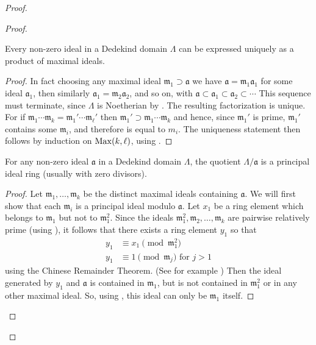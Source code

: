 \begin{proof}
\begin{proof}
\begin{lem}\label{lem:1.9}
	Every non-zero ideal in a Dedekind domain $\Lambda$ can be expressed uniquely as a product of maximal ideals.
\end{lem}

\begin{proof}
	In fact choosing any maximal ideal $\mathfrak{m}_{1} \supset \mathfrak{a}$ we have $\mathfrak{a}=\mathfrak{m}_{1} \mathfrak{a}_{1}$ for some ideal $\mathfrak{a}_{1}$, then similarly $\mathfrak{a}_{1}=\mathfrak{m}_{2} \mathfrak{a}_{2}$, and so on, with $\mathfrak{a} \subset \mathfrak{a}_{1} \subset \mathfrak{a}_{2} \subset \cdots$ This sequence must terminate, since $\Lambda$ is Noetherian by . The resulting factorization is unique. For if $\mathfrak{m}_{1} \cdots \mathfrak{m}_{k}=\mathfrak{m}_{1}' \cdots \mathfrak{m}_{\ell}'$ then $\mathfrak{m}_{1}' \supset \mathfrak{m}_{1} \cdots \mathfrak{m}_{k}$ and hence, since $\mathfrak{m}_{1}'$ is prime, $\mathfrak{m}_{1}'$ contains some $\mathfrak{m}_{i}$, and therefore is equal to $m_{i}$. The uniqueness statement then follows by induction on $\operatorname{Max}(k, \ell)$, using .
\end{proof}

\begin{lem}\label{lem:1.10}
	For any non-zero ideal $\mathfrak{a} $ in a Dedekind domain $\Lambda$, the quotient $\Lambda / \mathfrak{a}$ is a principal ideal ring (usually with zero divisors).
\end{lem}
\begin{proof}
	Let $\mathfrak{m}_{1}, \ldots, \mathfrak{m}_{k}$ be the distinct maximal ideals containing $\mathfrak{a}$. We will first show that each $\mathfrak{m}_{i}$ is a principal ideal modulo $\mathfrak{a}$. Let $x_{1}$ be a ring element which belongs to $\mathfrak{m}_{1}$ but not to $\mathfrak{m}_{1}^{2}$. Since the ideals $\mathfrak{m}_{1}^{2}, \mathfrak{m}_{2}, \ldots, \mathfrak{m}_{k}$ are pairwise relatively prime (using ), it follows that there exists a ring element $y_{1}$ so that
	\begin{align*}
		y_{1} &\equiv x_{1} \pmod{\mathfrak{m}_{1}^{2}} \\
		y_{1} &\equiv 1 \pmod{\mathfrak{m}_{j}} \text { for } j>1
	\end{align*}
	using the Chinese Remainder Theorem. (See for example \cite{Lang2012}) Then the ideal generated by $y_{1}$ and $\mathfrak{a}$ is contained in $\mathfrak{m}_{1}$, but is not contained in $\mathfrak{m}_{1}^{2}$ or in any other maximal ideal. So, using , this ideal can only be $\mathfrak{m}_{1}$ itself.


\end{proof}
\end{proof}
\end{proof}
